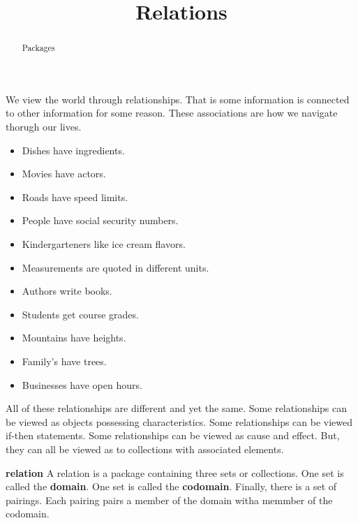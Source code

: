 \documentclass{ximera}
\title{Relations}
\begin{document}
\begin{abstract}
Packages
\end{abstract}
\maketitle


We view the world through relationships. That is some information is connected to other information for some reason. These associations are how we navigate thorugh our lives.

\begin{itemize}
\item Dishes have ingredients.
\item Movies have actors.
\item Roads have speed limits.
\item People have social security numbers.
\item Kindergarteners like ice cream flavors.
\item Measurements are quoted in different units.
\item Authors write books.
\item Students get course grades.
\item Mountains have heights.
\item Family's have trees.
\item Businesses have open hours.
\end{itemize}


All of these relationships are different and yet the same.  Some relationships can be viewed as objects possessing characteristics. Some relationships can be viewed if-then statements.  Some relationships can be viewed as cause and effect. But, they can all be viewed as to collections with associated elements.







\begin{definition} \textbf{relation} 
A relation is a package containing three sets or collections. One set is called the \textbf{domain}. One set is called the \textbf{codomain}.  Finally, there is a set of pairings.  Each pairing pairs a member of the domain witha memmber of the codomain.

\end{definition}
\end{document}
